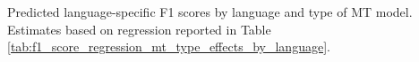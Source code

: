Predicted language-specific F1 scores by language and type of MT model. Estimates based on regression reported in Table \ref{tab:f1_score_regression_mt_type_effects_by_language}. \label{fig:f1_score_regression_mt_type_effects_by_language}
